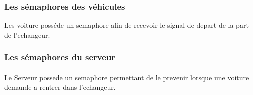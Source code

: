 \documentclass{report}
\begin{document}
			\subsubsection{Les sémaphores des véhicules}
			Les voiture posséde un semaphore afin de recevoir le signal de depart de la part de l'echangeur. 

			\subsubsection{Les sémaphores du serveur}
			\paragraph{}
			Le Serveur possede un semaphore permettant de le prevenir lorsque une voiture demande a rentrer dans l'echangeur.
		
		
	
\end{document}
